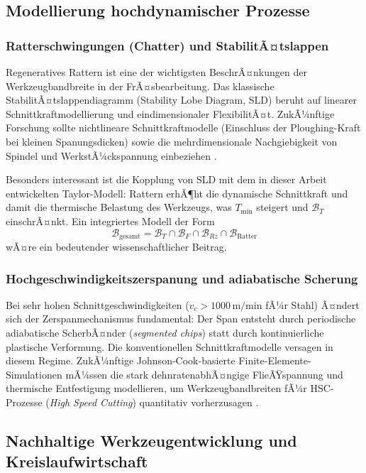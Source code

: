 ﻿\documentclass[a4paper,12pt]{article}
\theoremstyle{definition}
\begin{document}
\subsection{Modellierung hochdynamischer Prozesse}

\subsubsection{Ratterschwingungen (Chatter) und StabilitÃ¤tslappen}

Regeneratives Rattern ist eine der wichtigsten BeschrÃ¤nkungen der
Werkzeugbandbreite in der FrÃ¤sbearbeitung. Das klassische StabilitÃ¤tslappendiagramm
(Stability Lobe Diagram, SLD) beruht auf linearer Schnittkraftmodellierung
und eindimensionaler FlexibilitÃ¤t. ZukÃ¼nftige Forschung sollte nichtlineare
Schnittkraftmodelle (Einschluss der Ploughing-Kraft bei kleinen Spanungsdicken)
sowie die mehrdimensionale Nachgiebigkeit von Spindel und WerkstÃ¼ckspannung
einbeziehen \cite{altintas2012}.

Besonders interessant ist die Kopplung von SLD mit dem in dieser Arbeit
entwickelten Taylor-Modell: Rattern erhÃ¶ht die dynamische Schnittkraft und
damit die thermische Belastung des Werkzeugs, was $T_{\min}$ steigert und
$\mathcal{B}_T$ einschrÃ¤nkt. Ein integriertes Modell der Form
\[
  \mathcal{B}_{\text{gesamt}} = \mathcal{B}_T \cap \mathcal{B}_F \cap \mathcal{B}_{Rz}
  \cap \mathcal{B}_{\text{Ratter}}
\]
wÃ¤re ein bedeutender wissenschaftlicher Beitrag.

\subsubsection{Hochgeschwindigkeitszerspanung und adiabatische Scherung}

Bei sehr hohen Schnittgeschwindigkeiten ($v_c > 1000\,\mathrm{m/min}$
fÃ¼r Stahl) Ã¤ndert sich der Zerspanmechanismus fundamental: Der Span entsteht
durch periodische adiabatische ScherbÃ¤nder (\emph{segmented chips}) statt
durch kontinuierliche plastische Verformung. Die konventionellen
Schnittkraftmodelle versagen in diesem Regime. ZukÃ¼nftige
Johnson-Cook-basierte Finite-Elemente-Simulationen mÃ¼ssen die stark
dehnratenabhÃ¤ngige FlieÃŸspannung und thermische Entfestigung modellieren,
um Werkzeugbandbreiten fÃ¼r HSC-Prozesse (\emph{High Speed Cutting})
quantitativ vorherzusagen \cite{johnson1985}.

\subsection{Nachhaltige Werkzeugentwicklung und Kreislaufwirtschaft}
\end{document}
